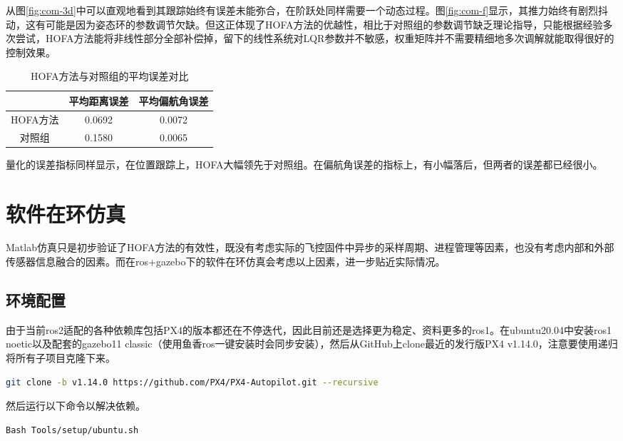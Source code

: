      从图\ref{fig:com-3d}中可以直观地看到其跟踪始终有误差未能弥合，在阶跃处同样需要一个动态过程。图\ref{fig:com-f}显示，其推力始终有剧烈抖动，这有可能是因为姿态环的参数调节欠缺。但这正体现了HOFA方法的优越性，相比于对照组的参数调节缺乏理论指导，只能根据经验多次尝试，HOFA方法能将非线性部分全部补偿掉，留下的线性系统对LQR参数并不敏感，权重矩阵并不需要精细地多次调解就能取得很好的控制效果。
     \begin{table}
      \centering
      \begin{tabular}{ccc}
          \toprule
          & 平均距离误差 & 平均偏航角误差 \\
          \midrule
          HOFA方法 & 0.0692 & 0.0072 \\
          对照组 & 0.1580 & 0.0065 \\
          \bottomrule
      \end{tabular}
      \caption{HOFA方法与对照组的平均误差对比}
  \end{table}

  量化的误差指标同样显示，在位置跟踪上，HOFA大幅领先于对照组。在偏航角误差的指标上，有小幅落后，但两者的误差都已经很小。

\section{软件在环仿真}
Matlab仿真只是初步验证了HOFA方法的有效性，既没有考虑实际的飞控固件中异步的采样周期、进程管理等因素，也没有考虑内部和外部传感器信息融合的因素。而在ros+gazebo下的软件在环仿真会考虑以上因素，进一步贴近实际情况。

\subsection{环境配置}
由于当前ros2适配的各种依赖库包括PX4的版本都还在不停迭代，因此目前还是选择更为稳定、资料更多的ros1。在ubuntu20.04中安装ros1 noetic以及配套的gazebo11 classic（使用鱼香ros一键安装\cite{fishros}时会同步安装），然后从GitHub上clone最近的发行版PX4 v1.14.0，注意要使用递归将所有子项目克隆下来。
\begin{lstlisting}[language=Bash, basicstyle=\footnotesize, linewidth=\linewidth]
  git clone -b v1.14.0 https://github.com/PX4/PX4-Autopilot.git --recursive
\end{lstlisting}

然后运行以下命令以解决依赖。

\begin{lstlisting}[language=Bash, basicstyle=\footnotesize, linewidth=\linewidth]
  Bash Tools/setup/ubuntu.sh
\end{lstlisting}

